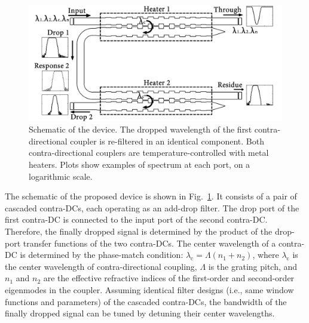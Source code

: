 \documentclass[osajnl,twocolumn,showpacs,superscriptaddress,10pt]{revtex4-1}
\begin{document}
\begin{figure}[htbp]
	\centering
	\includegraphics[width=1.00\columnwidth]{data/CascadedSchematic2}
	\centering
	\caption{Schematic of the device. 
	The dropped wavelength of the first contra-directional coupler is re-filtered in an identical component. 
	Both contra-directional couplers are temperature-controlled with metal heaters. 
	Plots show examples of spectrum at each port, on a logarithmic scale.}
	\label{fig:schematic}
\end{figure}

The schematic of the proposed device is shown in Fig.~\ref{fig:schematic}. 
It consists of a pair of cascaded contra-DCs, each operating as an add-drop filter. 
The drop port of the first contra-DC is connected to the input port of the second contra-DC. 
Therefore, the finally dropped signal is determined by the product of the  drop-port transfer functions of the two contra-DCs. The center wavelength of a contra-DC is determined by the phase-match condition: $\lambda_\text{c} = \Lambda (n_\text{1}+n_\text{2})$, where $\lambda_\text{c}$ is the center wavelength of contra-directional coupling, $\Lambda$ is the grating pitch, and $n_\text{1}$ and $n_\text{2}$ are the effective refractive indices of the first-order and second-order eigenmodes in the coupler. 
Assuming identical filter designs (i.e., same window functions and parameters) of the cascaded contra-DCs, the bandwidth of the finally dropped signal can be tuned by detuning their center wavelengths.
\end{document}
